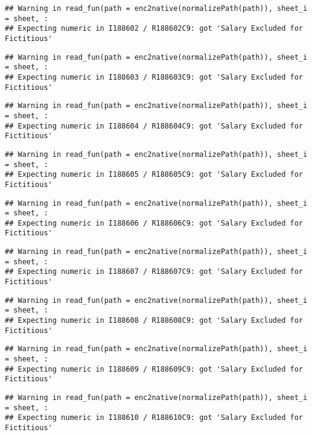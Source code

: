 \documentclass[
]{article}
\begin{document}
\begin{verbatim}
## Warning in read_fun(path = enc2native(normalizePath(path)), sheet_i = sheet, :
## Expecting numeric in I188602 / R188602C9: got 'Salary Excluded for Fictitious'
\end{verbatim}

\begin{verbatim}
## Warning in read_fun(path = enc2native(normalizePath(path)), sheet_i = sheet, :
## Expecting numeric in I188603 / R188603C9: got 'Salary Excluded for Fictitious'
\end{verbatim}

\begin{verbatim}
## Warning in read_fun(path = enc2native(normalizePath(path)), sheet_i = sheet, :
## Expecting numeric in I188604 / R188604C9: got 'Salary Excluded for Fictitious'
\end{verbatim}

\begin{verbatim}
## Warning in read_fun(path = enc2native(normalizePath(path)), sheet_i = sheet, :
## Expecting numeric in I188605 / R188605C9: got 'Salary Excluded for Fictitious'
\end{verbatim}

\begin{verbatim}
## Warning in read_fun(path = enc2native(normalizePath(path)), sheet_i = sheet, :
## Expecting numeric in I188606 / R188606C9: got 'Salary Excluded for Fictitious'
\end{verbatim}

\begin{verbatim}
## Warning in read_fun(path = enc2native(normalizePath(path)), sheet_i = sheet, :
## Expecting numeric in I188607 / R188607C9: got 'Salary Excluded for Fictitious'
\end{verbatim}

\begin{verbatim}
## Warning in read_fun(path = enc2native(normalizePath(path)), sheet_i = sheet, :
## Expecting numeric in I188608 / R188608C9: got 'Salary Excluded for Fictitious'
\end{verbatim}

\begin{verbatim}
## Warning in read_fun(path = enc2native(normalizePath(path)), sheet_i = sheet, :
## Expecting numeric in I188609 / R188609C9: got 'Salary Excluded for Fictitious'
\end{verbatim}

\begin{verbatim}
## Warning in read_fun(path = enc2native(normalizePath(path)), sheet_i = sheet, :
## Expecting numeric in I188610 / R188610C9: got 'Salary Excluded for Fictitious'
\end{verbatim}
\end{document}
